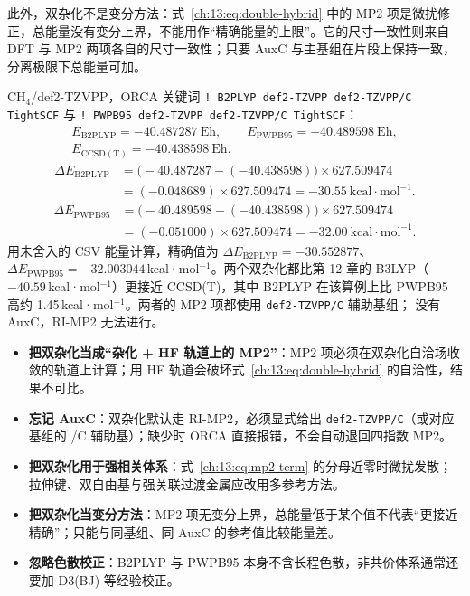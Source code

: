 此外，双杂化不是变分方法：式~\eqref{ch:13:eq:double-hybrid} 中的 MP2 项是微扰修正，总能量没有变分上界，不能用作“精确能量的上限”。它的尺寸一致性则来自 DFT 与 MP2 两项各自的尺寸一致性；只要 AuxC 与主基组在片段上保持一致，分离极限下总能量可加。

\begin{ch4box}
CH$_4$/def2-TZVPP，ORCA 关键词 \texttt{! B2PLYP def2-TZVPP def2-TZVPP/C TightSCF}
与 \texttt{! PWPB95 def2-TZVPP def2-TZVPP/C TightSCF}：
\[
\begin{gathered}
E_{\mathrm{B2PLYP}} = -40.487287\ \mathrm{Eh},\qquad
E_{\mathrm{PWPB95}} = -40.489598\ \mathrm{Eh},\\
E_{\mathrm{CCSD(T)}} = -40.438598\ \mathrm{Eh}.
\end{gathered}
\]
\[
\begin{aligned}
\Delta E_{\mathrm{B2PLYP}}
&= \big(-40.487287 -(-40.438598)\big)\times 627.509474\\
&= (-0.048689)\times 627.509474
= -30.55\ \mathrm{kcal\cdot mol^{-1}}.
\end{aligned}
\]
\[
\begin{aligned}
\Delta E_{\mathrm{PWPB95}}
&= \big(-40.489598 -(-40.438598)\big)\times 627.509474\\
&= (-0.051000)\times 627.509474
= -32.00\ \mathrm{kcal\cdot mol^{-1}}.
\end{aligned}
\]
用未舍入的 CSV 能量计算，精确值为 $\Delta E_{\mathrm{B2PLYP}}=-30.552877$、
$\Delta E_{\mathrm{PWPB95}}=-32.003044$\,kcal·mol$^{-1}$。两个双杂化都比第 12 章的
B3LYP（$-40.59$\,kcal·mol$^{-1}$）更接近 CCSD(T)，其中 B2PLYP 在该算例上比 PWPB95
高约 1.45\,kcal·mol$^{-1}$。两者的 MP2 项都使用 \texttt{def2-TZVPP/C} 辅助基组；
没有 AuxC，RI-MP2 无法进行。
\end{ch4box}

\begin{pitfall}
\begin{itemize}
  \item \textbf{把双杂化当成“杂化 + HF 轨道上的 MP2”}：MP2 项必须在双杂化自洽场收敛的轨道上计算；用 HF 轨道会破坏式~\eqref{ch:13:eq:double-hybrid} 的自洽性，结果不可比。
  \item \textbf{忘记 AuxC}：双杂化默认走 RI-MP2，必须显式给出 \texttt{def2-TZVPP/C}（或对应基组的 /C 辅助基）；缺少时 ORCA 直接报错，不会自动退回四指数 MP2。
  \item \textbf{把双杂化用于强相关体系}：式~\eqref{ch:13:eq:mp2-term} 的分母近零时微扰发散；拉伸键、双自由基与强关联过渡金属应改用多参考方法。
  \item \textbf{把双杂化当变分方法}：MP2 项无变分上界，总能量低于某个值不代表“更接近精确”；只能与同基组、同 AuxC 的参考值比较能量差。
  \item \textbf{忽略色散校正}：B2PLYP 与 PWPB95 本身不含长程色散，非共价体系通常还要加 D3(BJ) 等经验校正。
\end{itemize}
\end{pitfall}

